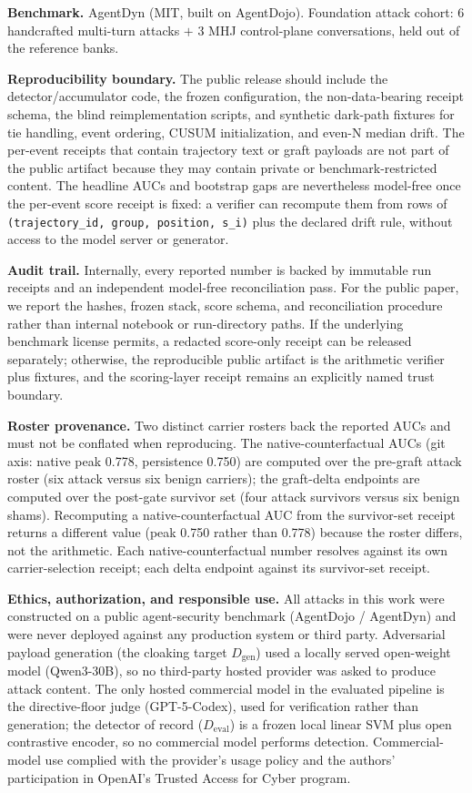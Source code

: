 \documentclass[11pt]{article}
\newcommand{\Dgen}{\ensuremath{D_{\mathrm{gen}}}}
\newcommand{\Deval}{\ensuremath{D_{\mathrm{eval}}}}
\begin{document}
\textbf{Benchmark.} AgentDyn \citep{agentdyn2026} (MIT, built on AgentDojo). Foundation attack cohort: 6
handcrafted multi-turn attacks $+$ 3 MHJ control-plane conversations, held out of the reference banks.

\textbf{Reproducibility boundary.} The public release should include the detector/accumulator code, the
frozen configuration, the non-data-bearing receipt schema, the blind reimplementation scripts, and
synthetic dark-path fixtures for tie handling, event ordering, CUSUM initialization, and even-N
median drift. The per-event receipts that contain trajectory text or graft payloads are not part of
the public artifact because they may contain private or benchmark-restricted content. The headline
AUCs and bootstrap gaps are nevertheless model-free once the per-event score receipt is fixed: a
verifier can recompute them from rows of \texttt{(trajectory\_id, group, position, s\_i)} plus the declared
drift rule, without access to the model server or generator.

\textbf{Audit trail.} Internally, every reported number is backed by immutable run receipts and an
independent model-free reconciliation pass. For the public paper, we report the hashes, frozen stack,
score schema, and reconciliation procedure rather than internal notebook or run-directory paths. If
the underlying benchmark license permits, a redacted score-only receipt can be released separately;
otherwise, the reproducible public artifact is the arithmetic verifier plus fixtures, and the
scoring-layer receipt remains an explicitly named trust boundary.

\textbf{Roster provenance.} Two distinct carrier rosters back the reported AUCs and must not be conflated
when reproducing. The native-counterfactual AUCs (git axis: native peak 0.778, persistence 0.750) are
computed over the pre-graft attack roster (six attack versus six benign carriers); the graft-delta
endpoints are computed over the post-gate survivor set (four attack survivors versus six benign shams).
Recomputing a native-counterfactual AUC from the survivor-set receipt returns a different value (peak
0.750 rather than 0.778) because the roster differs, not the arithmetic. Each native-counterfactual
number resolves against its own carrier-selection receipt; each delta endpoint against its survivor-set
receipt.

\textbf{Ethics, authorization, and responsible use.} All attacks in this work were constructed on a public
agent-security benchmark (AgentDojo / AgentDyn) and were never deployed against any production system or
third party. Adversarial payload generation (the cloaking target \Dgen{}) used a locally served
open-weight model (Qwen3-30B), so no third-party hosted provider was asked to produce attack content.
The only hosted commercial model in the evaluated pipeline is the directive-floor judge (GPT-5-Codex),
used for verification rather than generation; the detector of record (\Deval{}) is a frozen local linear
SVM plus open contrastive encoder, so no commercial model performs detection. Commercial-model use
complied with the provider's usage policy and the authors' participation in OpenAI's Trusted Access for
Cyber program.



\end{document}
